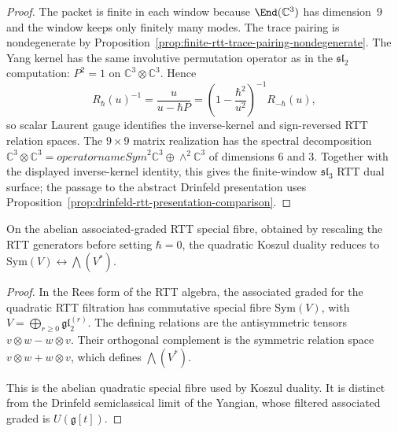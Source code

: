 \begin{proof}
The packet is finite in each window because
$\End(\mathbb C^3)$ has dimension~$9$ and the window keeps only
finitely many modes.  The trace pairing is nondegenerate by
Proposition~\ref{prop:finite-rtt-trace-pairing-nondegenerate}.  The
Yang kernel has the same involutive permutation operator as in the
$\mathfrak{sl}_2$ computation: $P^2=1$ on
$\mathbb C^3\otimes\mathbb C^3$.  Hence
\[
R_\hbar(u)^{-1}
=
\frac{u}{u-\hbar P}
=
\left(1-\frac{\hbar^2}{u^2}\right)^{-1}R_{-\hbar}(u),
\]
so scalar Laurent gauge identifies the inverse-kernel and sign-reversed
RTT relation spaces.  The $9\times9$ matrix realization has the
spectral decomposition
$\mathbb C^3\otimes\mathbb C^3=operatorname{Sym}^2\mathbb C^3
\oplus\wedge^2\mathbb C^3$ of dimensions $6$ and $3$.
Together with the displayed inverse-kernel identity, this gives the finite-window
$\mathfrak{sl}_3$ RTT dual surface; the passage to the abstract
Drinfeld presentation uses
Proposition~\ref{prop:drinfeld-rtt-presentation-comparison}.
\end{proof}

\begin{corollary}\label{cor:yangian-classical-self-dual}
On the abelian associated-graded RTT special fibre, obtained by
rescaling the RTT generators before setting $\hbar=0$, the quadratic
Koszul duality reduces to
$\mathrm{Sym}(V)\leftrightarrow\bigwedge(V^*)$.
\end{corollary}

\begin{proof}
In the Rees form of the RTT algebra, the associated graded for the
quadratic RTT filtration has commutative special fibre
$\mathrm{Sym}(V)$, with
$V=\bigoplus_{r\ge0}\mathfrak{gl}_2^{(r)}$.  The defining relations
are the antisymmetric tensors $v\otimes w-w\otimes v$.  Their
orthogonal complement is the symmetric relation space
$v\otimes w+w\otimes v$, which defines $\bigwedge(V^*)$.

This is the abelian quadratic special fibre used by Koszul duality.
It is distinct from the Drinfeld semiclassical limit of the Yangian,
whose filtered associated graded is $U(\mathfrak{g}[t])$.
\end{proof}


